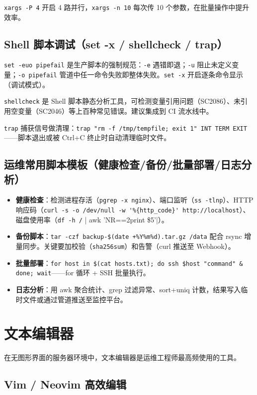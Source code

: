 \documentclass[12pt,UTF8]{ctexbook}
\begin{document}
\verb|xargs -P 4| 开启 4 路并行，\verb|xargs -n 10| 每次传 10 个参数，在批量操作中提升效率。

    \subsection{Shell 脚本调试（set -x / shellcheck / trap）}

\verb|set -euo pipefail| 是生产脚本的强制规范：\verb|-e| 遇错即退；\verb|-u| 阻止未定义变量；\verb|-o pipefail| 管道中任一命令失败即整体失败。\verb|set -x| 开启逐条命令显示（调试模式）。

\verb|shellcheck| 是 Shell 脚本静态分析工具，可检测变量引用问题（SC2086）、未引用空变量（SC2046）等上百种常见错误。建议集成到 CI 流水线中。

\verb|trap| 捕获信号做清理：\verb|trap "rm -f /tmp/tempfile; exit 1" INT TERM EXIT|——脚本退出或被 Ctrl+C 终止时自动清理临时文件。

    \subsection{运维常用脚本模板（健康检查/备份/批量部署/日志分析）}

\begin{itemize}
	\item \textbf{健康检查}：检测进程存活（\verb|pgrep -x nginx|）、端口监听（\verb|ss -tlnp|）、HTTP 响应码（\verb|curl -s -o /dev/null -w '%{http_code}' http://localhost|）、磁盘使用率（\verb|df -h /| | awk 'NR==2{print \$5}'|）。
	\item \textbf{备份脚本}：\verb|tar -czf backup-$(date +%Y%m%d).tar.gz /data| 配合 rsync 增量同步。关键要加校验（\verb|sha256sum|）和告警（curl 推送至 Webhook）。
	\item \textbf{批量部署}：\verb|for host in $(cat hosts.txt); do ssh $host "command" & done; wait|——for 循环 + SSH 批量执行。
	\item \textbf{日志分析}：用 awk 聚合统计、grep 过滤异常、sort+uniq 计数，结果写入临时文件或通过管道推送至监控平台。
\end{itemize}

  \section{文本编辑器}

在无图形界面的服务器环境中，文本编辑器是运维工程师最高频使用的工具。

    \subsection{Vim / Neovim 高效编辑}
\end{document}
